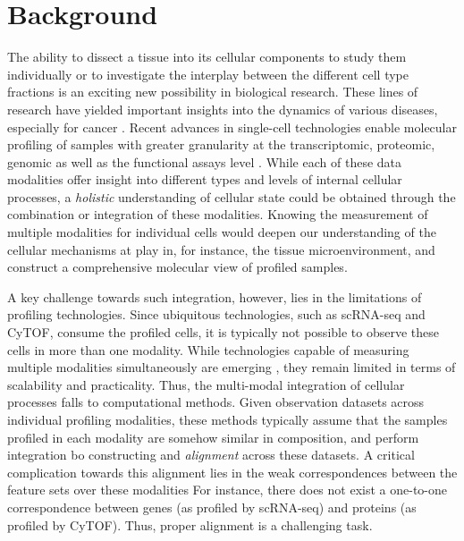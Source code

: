 \section{Background}
The ability to dissect a tissue into its cellular components to study them individually or to investigate the interplay between the different cell type fractions is an exciting new possibility in biological research.
These lines of research have yielded important insights into the dynamics of various diseases, especially for cancer \cite{chevrier2017,tirosh2016}.
Recent advances in single-cell technologies enable molecular profiling of samples with greater granularity at the transcriptomic, proteomic, genomic as well as the functional assays level \cite{irmisch2021,rozenblatt-rosen2017}.
While each of these data modalities offer insight into different types and levels of internal cellular processes,
a \textit{holistic} understanding of cellular state could be obtained through the combination or integration of these modalities.
Knowing the measurement of multiple modalities for individual cells would deepen our understanding of the cellular mechanisms at play in, for instance, the tissue microenvironment, and construct a comprehensive molecular view of profiled samples.

A key challenge towards such integration, however, lies in the limitations of profiling technologies.
Since ubiquitous technologies, such as scRNA-seq and CyTOF, consume the profiled cells, it is typically not possible to observe these cells in more than one modality.
While technologies capable of measuring multiple modalities simultaneously are emerging \cite{stoeckius2017,zhu2020}, they remain limited in terms of scalability and practicality.
Thus, the multi-modal integration of cellular processes falls to computational methods.
Given observation datasets across individual profiling modalities, these methods typically assume that the samples profiled in each modality are somehow similar in composition, and perform integration bo constructing and \textit{alignment} across these datasets.
A critical complication towards this alignment lies in the weak correspondences between the feature sets over these modalities
For instance, there does not exist a one-to-one correspondence between genes (as profiled by scRNA-seq) and proteins (as profiled by CyTOF).
Thus, proper alignment is a challenging task.

